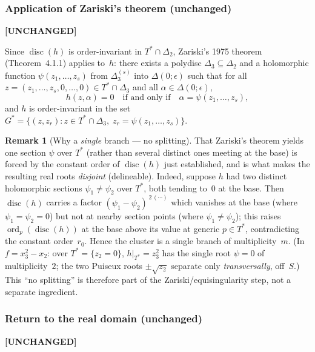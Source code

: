 \documentclass[11pt]{article}
\theoremstyle{plain}
\theoremstyle{definition}
\newtheorem*{remark}{Remark}
\DeclareMathOperator{\ord}{ord}
\DeclareMathOperator{\disc}{disc}
\begin{document}
\subsubsection{Application of Zariski's theorem (unchanged)}
\label{sssec:zariski}

\textbf{[UNCHANGED]}

Since $\disc(h)$ is order-invariant in $T^* \cap \Delta_2$, Zariski's
1975 theorem (Theorem~4.1.1) applies to~$h$:
there exists a polydisc $\Delta_3 \subseteq \Delta_2$ and a holomorphic
function $\psi(z_1, \ldots, z_s)$ from $\Delta_3^{(s)}$ into
$\Delta(0; \epsilon)$ such that for all
$z = (z_1, \ldots, z_s, 0, \ldots, 0) \in T^* \cap \Delta_3$ and all
$\alpha \in \Delta(0; \epsilon)$,
\[
  h(z, \alpha) = 0 \quad\text{if and only if}\quad
  \alpha = \psi(z_1, \ldots, z_s),
\]
and $h$ is order-invariant in the set
$G^* = \{ (z, z_r) : z \in T^* \cap \Delta_3,\;
z_r = \psi(z_1, \ldots, z_s) \}$.

\begin{remark}[Why a \emph{single} branch --- no splitting]
That Zariski's theorem yields one section $\psi$ over $T^*$ (rather than
several distinct ones meeting at the base) is forced by the constant order of
$\disc(h)$ just established, and is what makes the resulting real roots
\emph{disjoint} (delineable).  Indeed, suppose $h$ had two distinct holomorphic
sections $\psi_1 \ne \psi_2$ over $T^*$, both tending to~$0$ at the base.  Then
$\disc(h)$ carries a factor $(\psi_1 - \psi_2)^{\,2\,(\cdots)}$ which vanishes
at the base (where $\psi_1 = \psi_2 = 0$) but not at nearby section points
(where $\psi_1 \ne \psi_2$); this raises $\ord_p(\disc(h))$ at the base above
its value at generic $p \in T^*$, contradicting the constant order~$r_0$.
Hence the cluster is a single branch of multiplicity~$m$.  (In $f = x_3^2 -
x_2$: over $T^* = \{z_2 = 0\}$, $h|_{T^*} = z_3^2$ has the single root
$\psi = 0$ of multiplicity~$2$; the two Puiseux roots $\pm\sqrt{z_2}$ separate
only \emph{transversally}, off~$S$.)  This ``no splitting'' is therefore part
of the Zariski/equisingularity step, not a separate ingredient.
\end{remark}

\subsubsection{Return to the real domain (unchanged)}
\label{sssec:return_real}

\textbf{[UNCHANGED]}
\end{document}
